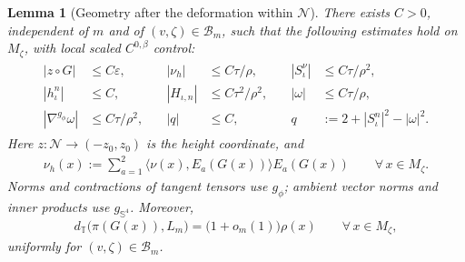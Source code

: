 \documentclass[a4paper,11pt,oneside,reqno]{amsart}
\numberwithin{equation}{section}
\newtheorem{lemma}[theorem]{Lemma}
\theoremstyle{definition}
\begin{document}
\begin{lemma}[Geometry after the deformation within $\mathcal N$]
    \label{lem:s4-full-family-geometry}
    There exists $C>0$, independent of $m$ and of
    $(v,\zeta)\in\mathcal B_m$, such that the following
    estimates hold on $M_\zeta$, with local scaled
    $C^{0,\beta}$ control:
    \begin{align}
        \label{eq:s4-full-family-geometry}
        \begin{aligned}
            |z\circ G|&\leq C\varepsilon,
            &\quad|\nu_h|&\leq C\tau/\rho,
            &\quad|S_\iota^\nu|&\leq C\tau/\rho^2,\\
            |h_\iota^n|&\leq C,
            &\quad|H_{\iota,n}|&\leq C\tau^2/\rho^2,
            &\quad|\omega|&\leq C\tau/\rho,\\
            |\nabla^{g_\phi}\omega|&\leq C\tau/\rho^2,
            &\quad|q|&\leq C,
            &\quad q&:=2+|S_\iota^n|^2-|\omega|^2.
        \end{aligned}
    \end{align}
    Here $z:\mathcal N\to(-z_0,z_0)$ is the height
    coordinate, and
    \begin{align*}
        \nu_h(x):=\sum_{a=1}^2
        \bigl\langle\nu(x),E_a(G(x))\bigr\rangle
             E_a(G(x))
        \qquad\forall\,x\in M_\zeta.
    \end{align*}
    Norms and contractions of tangent tensors use
    $g_\phi$; ambient vector norms and inner products use
    $g_{\mathbb S^4}$. Moreover,
    \begin{align}
        \label{eq:s4-deformed-scale}
        d_{\mathbb T}\bigl(\pi(G(x)),L_m\bigr)
          =\bigl(1+o_m(1)\bigr)\rho(x)
          \qquad\forall\,x\in M_\zeta,
    \end{align}
    uniformly for $(v,\zeta)\in\mathcal B_m$.
\end{lemma}
\end{document}
